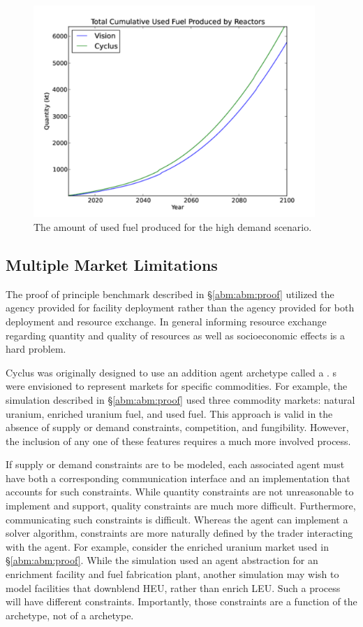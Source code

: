 \begin{figure}
  \begin{center}
    \includegraphics[height=8cm]{./figs/used_fuel_high.pdf}
    \caption{The amount of used fuel produced for the high demand scenario.}
    \label{fig:used_fuel_high}
  \end{center}  
\end{figure}

\subsection{Multiple Market Limitations}\label{abm:abm:limits}

The proof of principle benchmark described in \S \ref{abm:abm:proof} utilized
the agency provided for facility deployment rather than the agency provided for
both deployment and resource exchange. In general informing resource exchange
regarding quantity and quality of resources as well as socioeconomic effects is
a hard problem.

Cyclus was originally designed to use an addition agent archetype called a
. s were envisioned to represent markets for specific
commodities. For example, the simulation described in \S \ref{abm:abm:proof}
used three commodity markets: natural uranium, enriched uranium fuel, and used
fuel. This approach is valid in the absence of supply or demand constraints,
competition, and fungibility. However, the inclusion of any one of these
features requires a much more involved process.

If supply or demand constraints are to be modeled, each
associated  agent must have both a corresponding communication
interface and an implementation that accounts for such constraints. While
quantity constraints are not unreasonable to implement and support, quality
constraints are much more difficult. Furthermore, communicating such constraints
is difficult. Whereas the  agent can implement a solver algorithm,
constraints are more naturally defined by the trader interacting with the
 agent. For example, consider the enriched uranium market used in
\S \ref{abm:abm:proof}. While the simulation used an agent abstraction for an
enrichment facility and fuel fabrication plant, another simulation may wish to
model facilities that downblend HEU, rather than enrich LEU. Such a process will
have different constraints. Importantly, those constraints are a function of the
 archetype, not of a  archetype.

